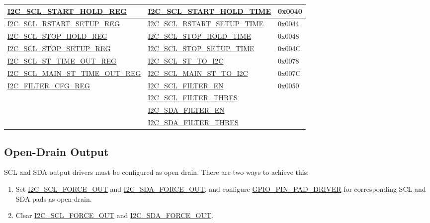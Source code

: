 \documentclass[main\_\_EN.tex]{subfiles}
\begin{document}
\begin{longtable}{ | p{6cm} | p{7cm} | p{2cm} | }
\hyperref[regdesc:I2CSCLSTARTHOLDREG]{I2C\_SCL\_START\_HOLD\_REG} & \hyperref[fielddesc:I2CSCLSTARTHOLDTIME]{I2C\_SCL\_START\_HOLD\_TIME} & 0x0040  \\ \hline
\hyperref[regdesc:I2CSCLRSTARTSETUPREG]{I2C\_SCL\_RSTART\_SETUP\_REG} & \hyperref[fielddesc:I2CSCLRSTARTSETUPTIME]{I2C\_SCL\_RSTART\_SETUP\_TIME} & 0x0044  \\ \hline

\hyperref[regdesc:I2CSCLSTOPHOLDREG]{I2C\_SCL\_STOP\_HOLD\_REG} & \hyperref[fielddesc:I2CSCLSTOPHOLDTIME]{I2C\_SCL\_STOP\_HOLD\_TIME} & 0x0048  \\ \hline
\hyperref[regdesc:I2CSCLSTOPSETUPREG]{I2C\_SCL\_STOP\_SETUP\_REG} & \hyperref[fielddesc:I2CSCLSTOPSETUPTIME]{I2C\_SCL\_STOP\_SETUP\_TIME} & 0x004C  \\ \hline

\hyperref[regdesc:I2CSCLSTTIMEOUTREG]{I2C\_SCL\_ST\_TIME\_OUT\_REG}& \hyperref[fielddesc:I2CSCLSTTOI2C]{I2C\_SCL\_ST\_TO\_I2C} & 0x0078\\ \hline
\hyperref[regdesc:I2CSCLMAINSTTIMEOUTREG]{I2C\_SCL\_MAIN\_ST\_TIME\_OUT\_REG}& \hyperref[fielddesc:I2CSCLMAINSTTOI2C]{I2C\_SCL\_MAIN\_ST\_TO\_I2C} & 0x007C\\ \hline


\hyperref[regdesc:I2CFILTERCFGREG]{I2C\_FILTER\_CFG\_REG} & {\hyperref[fielddesc:I2CSCLFILTEREN]{I2C\_SCL\_FILTER\_EN}} & 0x0050  \\\cline{2-2}
& {\hyperref[fielddesc:I2CSCLFILTERTHRES]{I2C\_SCL\_FILTER\_THRES}}& \\\cline{2-2}
& {\hyperref[fielddesc:I2CSDAFILTEREN]{I2C\_SDA\_FILTER\_EN}} &  \\\cline{2-2}
& {\hyperref[fielddesc:I2CSDAFILTERTHRES]{I2C\_SDA\_FILTER\_THRES}} & \\ \hline
\end{longtable}

\subsection{Open-Drain Output}
SCL and SDA output drivers must be configured as open drain. There are two ways to achieve this: 
\begin{enumerate}
\item Set \hyperref[fielddesc:I2CSCLFORCEOUT]{I2C\_SCL\_FORCE\_OUT} and \hyperref[fielddesc:I2CSDAFORCEOUT]{I2C\_SDA\_FORCE\_OUT}, and configure \hyperref[fielddesc:GPIOPINNPADDRIVER]{GPIO\_PIN\_PAD\_DRIVER} for corresponding SCL and SDA pads as open-drain.
\item Clear \hyperref[fielddesc:I2CSCLFORCEOUT]{I2C\_SCL\_FORCE\_OUT} and \hyperref[fielddesc:I2CSDAFORCEOUT]{I2C\_SDA\_FORCE\_OUT}.
\end{enumerate}
\end{document}
